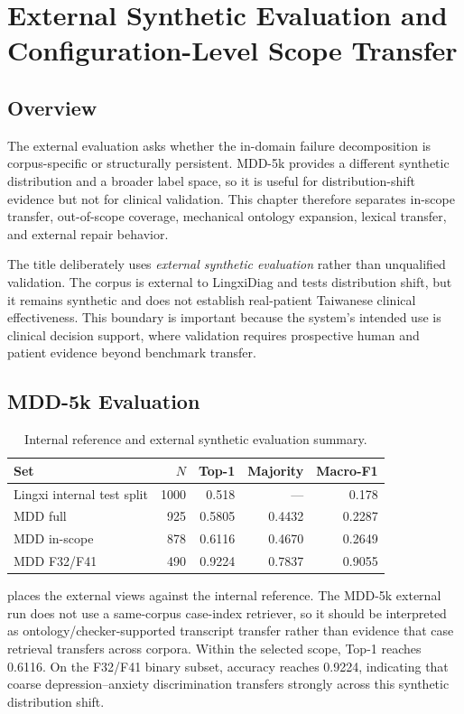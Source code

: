 \chapter{External Synthetic Evaluation and Configuration-Level Scope Transfer}
\label{ch:external}

\section{Overview}

The external evaluation asks whether the in-domain failure decomposition is corpus-specific or structurally persistent. MDD-5k provides a different synthetic distribution and a broader label space, so it is useful for distribution-shift evidence but not for clinical validation. This chapter therefore separates in-scope transfer, out-of-scope coverage, mechanical ontology expansion, lexical transfer, and external repair behavior.

The title deliberately uses \emph{external synthetic evaluation} rather than unqualified validation. The corpus is external to LingxiDiag and tests distribution shift, but it remains synthetic and does not establish real-patient Taiwanese clinical effectiveness. This boundary is important because the system's intended use is clinical decision support, where validation requires prospective human and patient evidence beyond benchmark transfer.

\section{MDD-5k Evaluation}

\begin{table}[htbp]
\centering
\caption{Internal reference and external synthetic evaluation summary.}
\label{tab:external-summary-rewrite}
\begin{tabular}{lrrrr}
\toprule
Set & $N$ & Top-1 & Majority & Macro-F1\\
\midrule
Lingxi internal test split & 1000 & 0.518 & --- & 0.178\\
MDD full & 925 & 0.5805 & 0.4432 & 0.2287\\
MDD in-scope & 878 & 0.6116 & 0.4670 & 0.2649\\
MDD F32/F41 & 490 & 0.9224 & 0.7837 & 0.9055\\
\bottomrule
\end{tabular}
\end{table}

 places the external views against the internal reference. The MDD-5k external run does not use a same-corpus case-index retriever, so it should be interpreted as ontology/checker-supported transcript transfer rather than evidence that case retrieval transfers across corpora. Within the selected scope, Top-1 reaches 0.6116. On the F32/F41 binary subset, accuracy reaches 0.9224, indicating that coarse depression--anxiety discrimination transfers strongly across this synthetic distribution shift.


